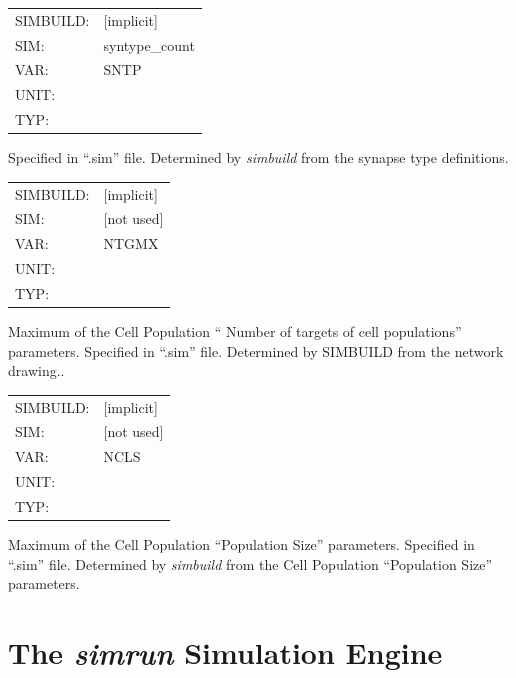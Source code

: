 \documentclass[12pt,openany,oneside]{book}
\newcommand{\prog}[1]{\textit{{#1}}}
\newcommand{\ext}[1]{{{``.#1''}}}
\newcommand{\inquotes}[1]{{{``#1''}}}
\begin{document}
\begin{flushleft}
\begin{tabular}{@{}ll@{}}
SIMBUILD: & [implicit]\\
SIM: & syntype\_count\\
VAR: & SNTP\\
UNIT: &\\
TYP: &\\
\end{tabular}
\end{flushleft}
\noindent
Specified in \ext{sim} file. Determined by \prog{simbuild} from the synapse
type definitions.
\filbreak
\vspace{\baselineskip}

\begin{flushleft}
\begin{tabular}{@{}ll@{}}
SIMBUILD: & [implicit]\\
SIM: & [not used]\\
VAR: & NTGMX\\
UNIT: &\\
TYP: &\\
\end{tabular}
\end{flushleft}
\noindent
Maximum of the Cell Population \inquotes{ Number of targets of cell
populations} parameters. Specified in \ext{sim} file. Determined by
SIMBUILD from the network drawing..
\filbreak
\vspace{\baselineskip}

\begin{flushleft}
\begin{tabular}{@{}ll@{}}
SIMBUILD: & [implicit]\\
SIM: & [not used]\\
VAR: & NCLS\\
UNIT: &\\
TYP: &\\
\end{tabular}
\end{flushleft}
\noindent
Maximum of the Cell Population \inquotes{Population Size} parameters.
Specified in \ext{sim} file. Determined by \prog{simbuild} from the Cell
Population \inquotes{Population Size} parameters.
\filbreak
\vspace{\baselineskip}


\section{The \prog{simrun} Simulation Engine}
\end{document}
